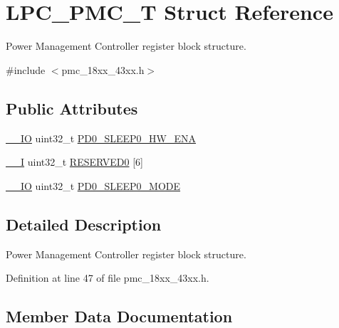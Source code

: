 \hypertarget{struct_l_p_c___p_m_c___t}{}\section{L\+P\+C\+\_\+\+P\+M\+C\+\_\+T Struct Reference}
\label{struct_l_p_c___p_m_c___t}


Power Management Controller register block structure.  




{\ttfamily \#include $<$pmc\+\_\+18xx\+\_\+43xx.\+h$>$}

\subsection*{Public Attributes}
\begin{DoxyCompactItemize}
\item 
\hyperlink{core__sc300_8h_aec43007d9998a0a0e01faede4133d6be}{\+\_\+\+\_\+\+IO} uint32\+\_\+t \hyperlink{struct_l_p_c___p_m_c___t_a012307165bc5d49d48001f342f69bb6c}{P\+D0\+\_\+\+S\+L\+E\+E\+P0\+\_\+\+H\+W\+\_\+\+E\+NA}
\item 
\hyperlink{core__sc300_8h_af63697ed9952cc71e1225efe205f6cd3}{\+\_\+\+\_\+I} uint32\+\_\+t \hyperlink{struct_l_p_c___p_m_c___t_adb3df3ecce2ea8154b410ce505b42354}{R\+E\+S\+E\+R\+V\+E\+D0} \mbox{[}6\mbox{]}
\item 
\hyperlink{core__sc300_8h_aec43007d9998a0a0e01faede4133d6be}{\+\_\+\+\_\+\+IO} uint32\+\_\+t \hyperlink{struct_l_p_c___p_m_c___t_aa7e6af3a03da05230646526186461f48}{P\+D0\+\_\+\+S\+L\+E\+E\+P0\+\_\+\+M\+O\+DE}
\end{DoxyCompactItemize}


\subsection{Detailed Description}
Power Management Controller register block structure. 

Definition at line 47 of file pmc\+\_\+18xx\+\_\+43xx.\+h.



\subsection{Member Data Documentation}
\mbox{\label{struct_l_p_c___p_m_c___t_a012307165bc5d49d48001f342f69bb6c}} 

